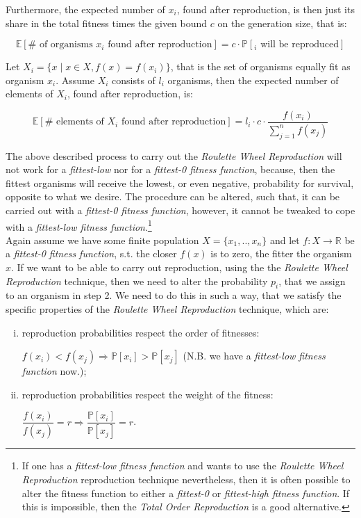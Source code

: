 \documentclass[a4paper]{article}
\newcommand{\Prob}[1]{\mathbb{P}[#1]}
\newcommand{\Expec}[1]{\mathbb{E}[#1]}
\theoremstyle{dotless}
\begin{document}
Furthermore, the expected number of $x_i$, found after reproduction, is then just its share in the total fitness times the given bound $c$ on the generation size, that is:

\begin{equation}
\Expec{\# \text{ of organisms $x_i$ found after reproduction}} = c \cdot \Prob{_i \text{ will be reproduced}}
\end{equation}

Let $X_i = \{ x \mid x \in X, f(x)=f(x_i) \}$, that is the set of organisms equally fit as organism $x_i$. Assume $X_i$ consists of $l_i$ organisms, then the expected number of elements of $X_i$, found after reproduction, is:

\begin{equation}\label{expected number rwr}
\Expec{ \# \text{ elements of } X_i \text{ found after reproduction}} = l_i \cdot c \cdot \dfrac{f(x_i)}{\sum^n_{j=1} f(x_j)}
\end{equation}

The above described process to carry out the \emph{Roulette Wheel Reproduction} will not work for a \emph{fittest-low} nor for a \emph{fittest-0 fitness function}, because, then the fittest organisms will receive the lowest, or even negative, probability for survival, opposite to what we desire. The procedure can be altered, such that, it can be carried out with a \emph{fittest-0 fitness function}, however, it cannot be tweaked to cope with a \emph{fittest-low fitness function}.\footnote{If one has a \emph{fittest-low fitness function} and wants to use the \emph{Roulette Wheel Reproduction} reproduction technique nevertheless, then it is often possible to alter the fitness function to either  a \emph{fittest-0} or \emph{fittest-high fitness function}. If this is impossible, then the \textit{Total Order Reproduction} is a good alternative.}\\

Again assume we have some finite population $X=\{x_1,..,x_n \}$ and let $f: X \rightarrow \mathbb{R}$ be a \emph{fittest-0 fitness function}, s.t. the closer $f(x)$ is to zero, the fitter the organism $x$. If we want to be able to carry out reproduction, using the the \emph{Roulette Wheel Reproduction} technique, then we need to alter the probability $p_i$, that we assign to an organism in step 2. We need to do this in such a way, that we satisfy the specific properties of the \emph{Roulette Wheel Reproduction} technique, which are:

	\begin{enumerate}[(i)]
	\item reproduction probabilities respect the order of fitnesses:
	\begin{center}
	$f(x_i) < f(x_j) \Rightarrow \Prob{x_i} > \Prob{x_j}$ (N.B. we have a \emph{fittest-low fitness function} now.);
	\end{center}
	\item reproduction probabilities respect the weight of the fitness:
	\begin{center}
	$\dfrac{f(x_i)}{f(x_j)} = r \Rightarrow \dfrac{\Prob{x_i}}{\Prob{x_j}} = r$.
	\end{center}
	\end{enumerate}
\end{document}
